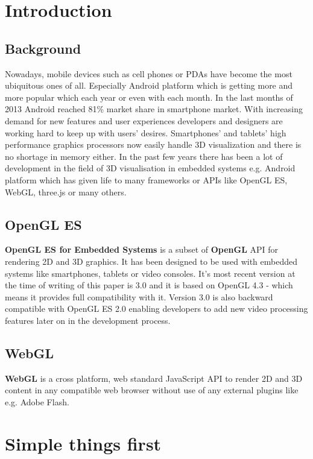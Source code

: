 \documentclass[a4paper,12pt]{article}
\begin{document}
\section{Introduction}

\subsection{Background}
Nowadays, mobile devices such as cell phones or PDAs have become the most ubiquitous ones of all.
Especially Android platform which is getting more and more popular which each year or even with each month.
In the last months of 2013 Android reached 81\% market share in smartphone market. 
With increasing demand for new features and user experiences developers and designers are working hard to keep up with users' desires.
Smartphones’ and tablets’ high performance graphics processors now easily handle 3D visualization and there is no shortage in memory either. 
In the past few years there has been a lot of development in the field of 3D visualisation in embedded systems e.g. Android platform which has given life to many frameworks or APIs like OpenGL ES, WebGL, three.js or many others.


\subsection{OpenGL ES}
\textbf{OpenGL ES for Embedded Systems} is a subset of \textbf{OpenGL} API for rendering 2D and 3D graphics.
It has been designed to be used with embedded systems like smartphones, tablets or video consoles.
It's most recent version at the time of writing of this paper is 3.0 and it is based on OpenGL 4.3 - which means it provides full compatibility with it. 
Version 3.0 is also backward compatible with OpenGL ES 2.0 enabling developers to add new video processing features later on in the development process.


\subsection{WebGL}
\textbf{WebGL} is a cross platform, web standard JavaScript API to render 2D and 3D content in any compatible web browser without use of any external plugins like e.g. Adobe Flash.




\pagebreak[4]
\section{Simple things first}
\end{document}

